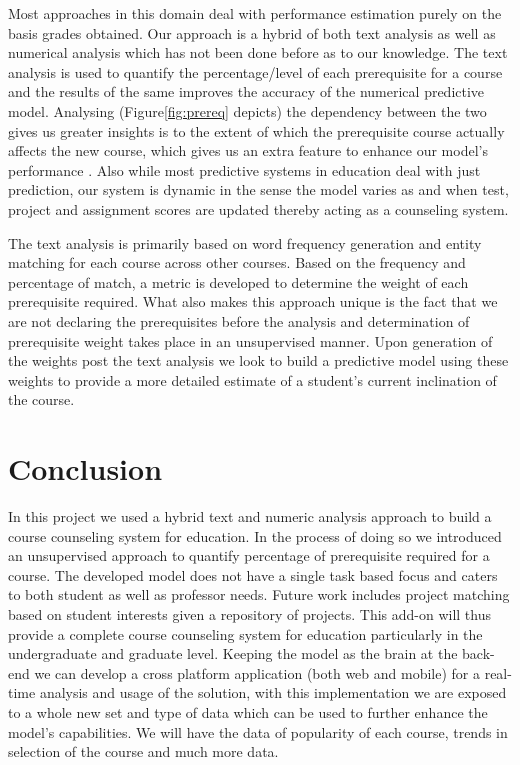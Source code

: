 \documentclass[conference]{IEEEtran}
\begin{document}
Most approaches in this domain deal with performance estimation purely on the basis grades obtained. Our approach is a hybrid of both text analysis as well as numerical analysis which has not been done before as to our knowledge. The text analysis is used to quantify the percentage/level of each prerequisite for a course and the results of the same improves the accuracy of the numerical predictive model. Analysing (Figure\ref{fig:prereq} depicts) the dependency between the two gives us greater insights is to the extent of which the prerequisite course actually affects the new course, which gives us an extra feature to enhance our model's performance . Also while most predictive systems in education deal with just prediction, our system is dynamic in the sense the model varies as and when test, project and assignment scores are updated thereby acting as a counseling system.

The text analysis is primarily based on word frequency generation and entity matching for each course across other courses. Based on the frequency and percentage of match, a metric is developed to determine the weight of each prerequisite required. What also makes this approach unique is the fact that we are not declaring the prerequisites before the analysis and determination of prerequisite weight takes place in an unsupervised manner. Upon generation of the weights post the text analysis we look to build a predictive model using these weights to provide a more detailed estimate of a student's current inclination of the course.
\fi

	\section{Conclusion}
In this project we used a hybrid text and numeric analysis approach to build a course counseling system for education. In the process of doing so we introduced an unsupervised approach to quantify percentage of prerequisite required for a course. The developed model does not have a single task based focus and caters to both student as well as professor needs. Future work includes project matching based on student interests given a repository of projects. This add-on will thus provide a complete course counseling system for education particularly in the undergraduate and graduate level. Keeping the model as the brain at the back-end we can develop a cross platform application (both web and mobile) for a real-time analysis and usage of the solution, with this implementation we are exposed to a whole new set and type of data which can be used to further enhance the model's capabilities. We will have the data of popularity of each course, trends in selection of the course and much more data.
\end{document}
